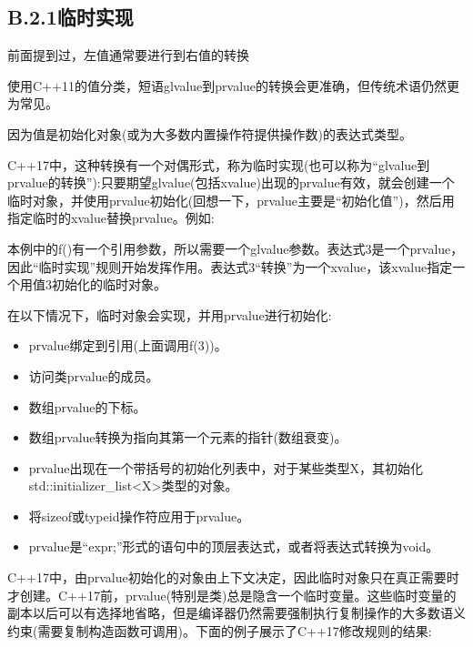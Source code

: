\subsection{B.2.1\hspace{0.2cm}临时实现}

前面提到过，左值通常要进行到右值的转换

\begin{tcolorbox}[colback=webgreen!5!white,colframe=webgreen!75!black]
\hspace*{0.75cm}使用C++11的值分类，短语glvalue到prvalue的转换会更准确，但传统术语仍然更为常见。
\end{tcolorbox}

因为值是初始化对象(或为大多数内置操作符提供操作数)的表达式类型。

C++17中，这种转换有一个对偶形式，称为临时实现(也可以称为“glvalue到prvalue的转换”):只要期望glvalue(包括xvalue)出现的prvalue有效，就会创建一个临时对象，并使用prvalue初始化(回想一下，prvalue主要是“初始化值”)，然后用指定临时的xvalue替换prvalue。例如:

本例中的f()有一个引用参数，所以需要一个glvalue参数。表达式3是一个prvalue，因此“临时实现”规则开始发挥作用。表达式3“转换”为一个xvalue，该xvalue指定一个用值3初始化的临时对象。

在以下情况下，临时对象会实现，并用prvalue进行初始化:

\begin{itemize}
\item 
prvalue绑定到引用(上面调用f(3))。

\item 
访问类prvalue的成员。

\item 
数组prvalue的下标。

\item 
数组prvalue转换为指向其第一个元素的指针(数组衰变)。

\item 
prvalue出现在一个带括号的初始化列表中，对于某些类型X，其初始化std::initializer\_list<X>类型的对象。

\item 
将sizeof或typeid操作符应用于prvalue。

\item 
prvalue是“expr;”形式的语句中的顶层表达式，或者将表达式转换为void。
\end{itemize}

C++17中，由prvalue初始化的对象由上下文决定，因此临时对象只在真正需要时才创建。C++17前，prvalue(特别是类)总是隐含一个临时变量。这些临时变量的副本以后可以有选择地省略，但是编译器仍然需要强制执行复制操作的大多数语义约束(需要复制构造函数可调用)。下面的例子展示了C++17修改规则的结果:

